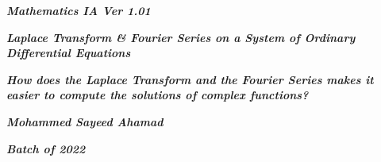 

\begin{titlepage}
    \begin{center}
            
        \date{}
            
        \huge
            
        \textit{\textbf{Mathematics IA Ver 1.01}}
            
        \vspace{0.25cm}
            
        \hline
            
        \vspace{2.5cm}
            
        \textit{\textbf{Laplace Transform \& Fourier Series on a System of Ordinary Differential Equations}}
            
        \vspace{1cm}
            
        \LARGE
            
        \textit{\textbf{How does the Laplace Transform and the Fourier Series makes it easier to compute the solutions of complex functions? }}
            
        \vspace{2.5cm}
            
        \Large
            
        \textit{\textbf{Mohammed Sayeed Ahamad}}
            
        \vspace{4cm}
            
        \Large
            
        \textit{\textbf{Batch of 2022}}
            
        \vspace{0.25cm}
            
        \hline
           
            
    \end{center}
\end{titlepage}



